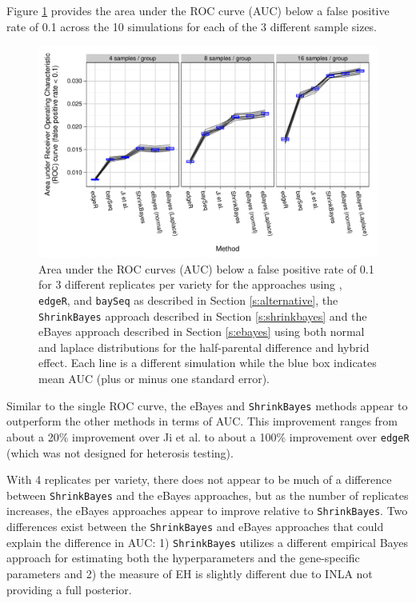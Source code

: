 \documentclass[useAMS,usenatbib,referee]{biom}
\newcommand{\edgeR}{{\tt edgeR}}
\newcommand{\baySeq}{{\tt baySeq}}
\newcommand{\ShrinkBayes}{{\tt ShrinkBayes}}
\begin{document}
Figure \ref{f:auc} provides the area under the ROC curve (AUC) below a false positive rate of 0.1 across the 10 simulations for each of the 3 different sample sizes. 
\begin{figure}
\centerline{\includegraphics[width=\textwidth]{auc-facet-TRUE}}
\caption{Area under the ROC curves (AUC) below a false positive rate of 0.1 for 3 different replicates per variety for the approaches using \citeauthor{ji2014estimation}, \edgeR{}, and \baySeq{} as described in Section \ref{s:alternative}, the \ShrinkBayes{} approach described in Section \ref{s:shrinkbayes} and the eBayes approach described in Section \ref{s:ebayes} using both normal and laplace distributions for the half-parental difference and hybrid effect. Each line is a different simulation while the blue box indicates mean AUC (plus or minus one standard error).}
\label{f:auc}
\end{figure}
Similar to the single ROC curve, the eBayes and \ShrinkBayes{} methods appear to outperform the other methods in terms of AUC. This improvement ranges from about a 20\% improvement over Ji et al. to about a 100\% improvement over \edgeR{} (which was not designed for heterosis testing).

With 4 replicates per variety, there does not appear to be much of a difference between \ShrinkBayes{} and the eBayes approaches, but as the number of replicates increases, the eBayes approaches appear to improve relative to \ShrinkBayes{}. Two differences exist between the \ShrinkBayes{} and eBayes approaches that could explain the difference in AUC: 1) \ShrinkBayes{} utilizes a different empirical Bayes approach for estimating both the hyperparameters and the gene-specific parameters and 2) the measure of EH is slightly different due to INLA not providing a full posterior. 
\end{document}
